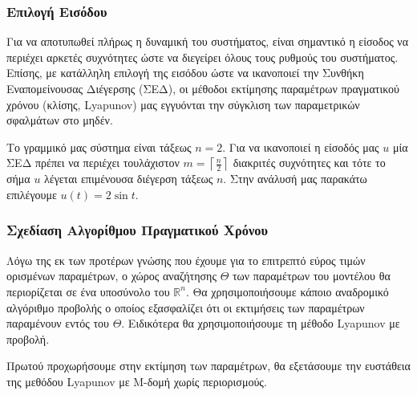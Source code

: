 \documentclass[a4paper,12pt]{article}
\begin{document}
\subsubsection*{Επιλογή Εισόδου}

Για να αποτυπωθεί πλήρως η δυναμική του συστήματος, είναι σημαντικό η είσοδος να περιέχει αρκετές
συχνότητες ώστε να διεγείρει όλους τους ρυθμούς του συστήματος. Επίσης, με κατάλληλη επιλογή της
εισόδου ώστε να ικανοποιεί την Συνθήκη Εναπομείνουσας Διέγερσης (ΣΕΔ), οι μέθοδοι εκτίμησης παραμέτρων 
πραγματικού χρόνου (κλίσης, Lyapunov) μας εγγυόνται την 
σύγκλιση των παραμετρικών σφαλμάτων στο μηδέν.

Το γραμμικό μας σύστημα είναι τάξεως $n=2$. Για να ικανοποιεί η είσοδός μας $u$ μία ΣΕΔ πρέπει
να περιέχει τουλάχιστον $m = \left\lceil \frac{n}{2} \right\rceil$ διακριτές συχνότητες και τότε
το σήμα $u$ λέγεται επιμένουσα διέγερση τάξεως $n$. Στην ανάλυσή μας παρακάτω επιλέγουμε $u(t) = 2 \sin t$.

\subsubsection*{Σχεδίαση Αλγορίθμου Πραγματικού Χρόνου}
Λόγω της εκ των προτέρων γνώσης που έχουμε για το επιτρεπτό εύρος τιμών ορισμένων παραμέτρων, 
ο χώρος αναζήτησης $\Theta$ των παραμέτρων του μοντέλου θα περιορίζεται σε ένα υποσύνολο του $\mathbb{R}^n$.
Θα χρησιμοποιήσουμε κάποιο αναδρομικό αλγόριθμο προβολής ο οποίος εξασφαλίζει ότι οι εκτιμήσεις των
παραμέτρων παραμένουν εντός του $\Theta$. Ειδικότερα θα χρησιμοποιήσουμε τη μέθοδο 
Lyapunov με προβολή.

Πρωτού προχωρήσουμε στην εκτίμηση των παραμέτρων, θα εξετάσουμε την ευστάθεια της μεθόδου 
Lyapunov με Μ-δομή χωρίς περιορισμούς.
\end{document}
